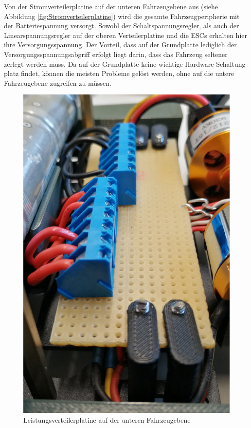 \begin{minipage}[t]{0.47\textwidth}
Von der Stromverteilerplatine auf der unteren Fahrzeugebene aus (siehe Abbildung \ref{fig:Stromverteilerplatine}) wird die gesamte Fahrzeugperipherie mit der Batteriespannung versorgt. Sowohl der Schaltspannungsregler, als auch der Linearspannungsregler auf der oberen Verteilerplatine und die \acp{ESC} erhalten hier ihre Versorgungsspannung. Der Vorteil, dass auf der Grundplatte lediglich der Versorgungsspannungsabgriff erfolgt liegt darin, dass das Fahrzeug seltener zerlegt werden muss. Da auf der Grundplatte keine wichtige Hardware-Schaltung platz findet, können die meisten Probleme gelöst werden, ohne auf die untere Fahrzeugebene zugreifen zu müssen.
\end{minipage}
\begin{minipage}[t]{0.47\textwidth}
\vspace{-7mm}
\begin{figure}[H] %
\includegraphics[width=.7\textwidth]{sec8/images/Leistungsverteilerplatine} 
\centering
\captionsetup{width=.9\textwidth}
\caption[Leistungsverteilerplatine auf der unteren Fahrzeugebene]{Leistungsverteilerplatine auf der unteren Fahrzeugebene}
\centering
\label{fig:Leistungsverteilerplatine}
\end{figure}
\end{minipage}


